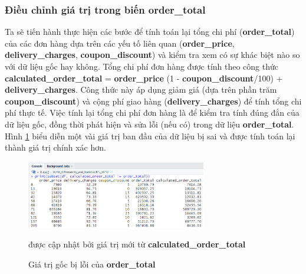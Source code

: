 \subsubsection{Điều chỉnh giá trị trong biến order\_total}
Ta sẽ tiến hành thực hiện các bước để tính toán lại tổng chi phí (\textbf{order\_total}) của các đơn hàng dựa trên các yếu tố liên quan (\textbf{order\_price}, \textbf{delivery\_charges}, \textbf{coupon\_discount}) và kiểm tra xem có sự khác biệt nào so với dữ liệu gốc hay không. Tổng chi phí đơn hàng được tính theo công thức \textbf{calculated\_order\_total} = \textbf{order\_price} \times (1 - \textbf{coupon\_discount}/100) + \textbf{delivery\_charges}. Công thức này áp dụng giảm giá (dựa trên phần trăm \textbf{coupon\_discount}) và cộng phí giao hàng (\textbf{delivery\_charges}) để tính tổng chi phí thực tế. Việc tính lại tổng chi phí đơn hàng là để kiểm tra tính đúng đắn của dữ liệu gốc, đồng thời phát hiện và sửa lỗi (nếu có) trong dữ liệu \textbf{order\_total}. Hình \ref{f5} biểu diễn một vài giá trị ban đầu của dữ liệu bị sai và được tính toán lại thành giá trị chính xác hơn.
\begin{figure}[!htbp]
    \centering
    \includegraphics[width=0.7\textwidth]{graphics/Pre_processing_data/f5.PNG}
    \caption{Giá trị gốc bị lỗi của \textbf{order\_total}} được cập nhật bởi giá trị mới từ \textbf{calculated\_order\_total} 
    \label{f5}
\end{figure}

